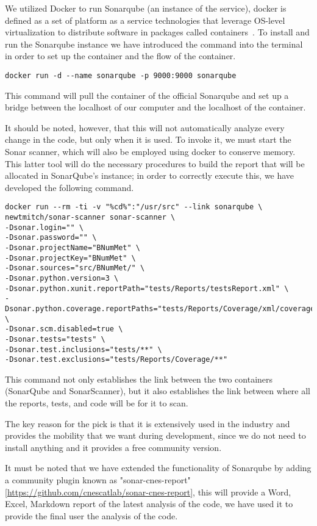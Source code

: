 We utilized Docker to run Sonarqube (an instance of the service), docker is defined as a set of platform as a service technologies that leverage OS-level virtualization to distribute software in packages called containers~\cite{enwiki:1148220158}. To install and run the Sonarqube instance we have introduced the command into the terminal in order to set up the container and the flow of the container.

\begin{lstlisting}
docker run -d --name sonarqube -p 9000:9000 sonarqube
\end{lstlisting}

This command will pull the container of the official Sonarqube and set up a bridge between the localhost of our computer and the localhost of the container.

It should be noted, however, that this will not automatically analyze every change in the code, but only when it is used. To invoke it, we must start the Sonar scanner, which will also be employed using docker to conserve memory. This latter tool will do the necessary procedures to build the report that will be allocated in SonarQube's instance; in order to correctly execute this, we have developed the following command.

\begin{lstlisting}
docker run --rm -ti -v "%cd%":"/usr/src" --link sonarqube \
newtmitch/sonar-scanner sonar-scanner \
-Dsonar.login="" \
-Dsonar.password="" \
-Dsonar.projectName="BNumMet" \
-Dsonar.projectKey="BNumMet" \
-Dsonar.sources="src/BNumMet/" \
-Dsonar.python.version=3 \
-Dsonar.python.xunit.reportPath="tests/Reports/testsReport.xml" \
-Dsonar.python.coverage.reportPaths="tests/Reports/Coverage/xml/coverage.xml" \
-Dsonar.scm.disabled=true \
-Dsonar.tests="tests" \
-Dsonar.test.inclusions="tests/**" \
-Dsonar.test.exclusions="tests/Reports/Coverage/**"
\end{lstlisting}

This command not only establishes the link between the two containers (SonarQube and SonarScanner), but it also establishes the link between where all the reports, tests, and code will be for it to scan.

The key reason for the pick is that it is extensively used in the industry and provides the mobility that we want during development, since we do not need to install anything and it provides a free community version.

It must be noted that we have extended the functionality of Sonarqube by adding a community plugin known as "sonar-cnes-report" [\href{https://github.com/cnescatlab/sonar-cnes-report}{https://github.com/cnescatlab/sonar-cnes-report}], this will provide a Word, Excel, Markdown report of the latest analysis of the code, we have used it to provide the final user the analysis of the code.